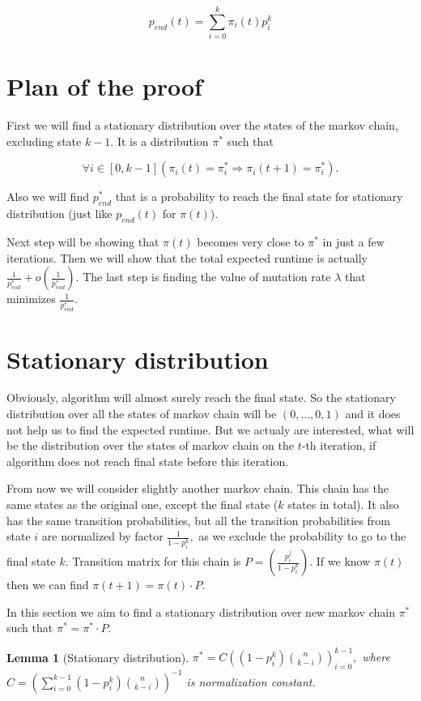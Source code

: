 \documentclass{article}
\newtheorem{lemma}{Lemma}
\begin{document}
$$p_{end}(t) = \sum\limits_{i = 0}^k \pi_i(t) p_i^k$$

\section{Plan of the proof}

First we will find a stationary distribution over the states of the markov chain, excluding state $k - 1$. It is a distribution $\pi^*$ such that

$$\forall i \in [0, k - 1] (\pi_i(t) = \pi^*_i \Rightarrow \pi_i(t + 1) = \pi^*_i).$$

Also we will find $p_{end}^*$ that is a probability to reach the final state for stationary distribution (just like $p_{end}(t)$ for $\pi(t)$).

Next step will be showing that $\pi(t)$ becomes very close to $\pi^*$ in just a few iterations. Then we will show that the total expected runtime is actually $\frac{1}{p_{end}^*} +o\left(\frac{1}{p_{end}^*} \right)$. The last step is finding the value of mutation rate $\lambda$ that minimizes $\frac{1}{p_{end}^*}.$

\section{Stationary distribution}

Obviously, algorithm will almost surely reach the final state. So the stationary distribution over all the states of markov chain will be $(0, \dots, 0, 1)$ and it does not help us to find the expected runtime. But we actualy are interested, what will be the distribution over the states of markov chain on the $t$-th iteration, if algorithm does not reach final state before this iteration.

From now we will consider slightly another markov chain. This chain has the same states as the original one, except the final state ($k$ states in total). It also has the same transition probabilities, but all the transition probabilities from state $i$ are normalized by factor $\frac{1}{1 - p_i^k},$ as we exclude the probability to go to the final state $k$. Transition matrix for this chain is $P = \left(\frac{p_i^j}{1 - p_i^k}\right).$ If we know $\pi(t)$ then we can find $\pi(t + 1) = \pi(t) \cdot P.$

In this section we aim to find a stationary distribution over new markov chain $\pi^*$ such that $\pi^* = \pi^* \cdot P.$


\begin{lemma}[Stationary distribution]
$\pi^* = C \left((1 - p_i^k) \binom{n}{k - i}\right)_{i = 0}^{k - 1},$ where $C = \left(\sum\limits_{i = 0}^{k - 1} (1 - p_i^k) \binom{n}{k - i}\right)^{-1}$ is normalization constant.
\end{lemma}
\end{document}
